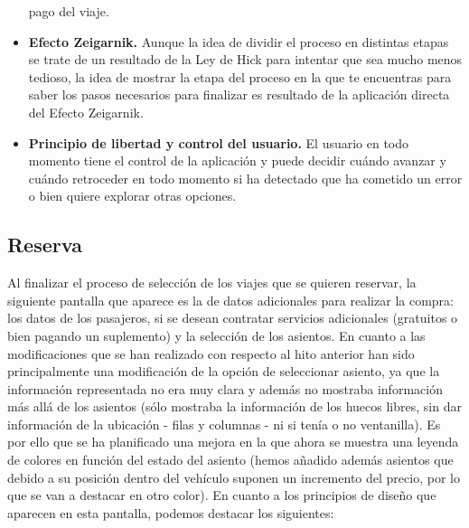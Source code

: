 \begin{itemize}
        pago del viaje.
    \item \textbf{Efecto Zeigarnik.} Aunque la idea de dividir el proceso en distintas etapas se trate de un resultado de la
        Ley de Hick para intentar que sea mucho menos tedioso, la idea de mostrar la etapa del proceso en la que te
        encuentras para saber los pasos necesarios para finalizar es resultado de la aplicación directa del Efecto
        Zeigarnik.
    \item \textbf{Principio de libertad y control del usuario.} El usuario en todo momento tiene el control de la aplicación
        y puede decidir cuándo avanzar y cuándo retroceder en todo momento si ha detectado que ha cometido un error
        o bien quiere explorar otras opciones.
\end{itemize}

\subsection*{Reserva}

Al finalizar el proceso de selección de los viajes que se quieren reservar, la siguiente pantalla que aparece es
la de datos adicionales para realizar la compra: los datos de los pasajeros, si se desean contratar servicios
adicionales (gratuitos o bien pagando un suplemento) y la selección de los asientos. En cuanto a las modificaciones
que se han realizado con respecto al hito anterior han sido principalmente una modificación de la opción de seleccionar
asiento, ya que la información representada no era muy clara y además no mostraba información más allá de los asientos
(sólo mostraba la información de los huecos libres, sin dar información de la ubicación - filas y columnas - ni si
tenía o no ventanilla). Es por ello que se ha planificado una mejora en la que ahora se muestra una leyenda de
colores en función del estado del asiento (hemos añadido además asientos que debido a su posición dentro del vehículo
suponen un incremento del precio, por lo que se van a destacar en otro color). En cuanto a los principios de diseño que
aparecen en esta pantalla, podemos destacar los siguientes:

